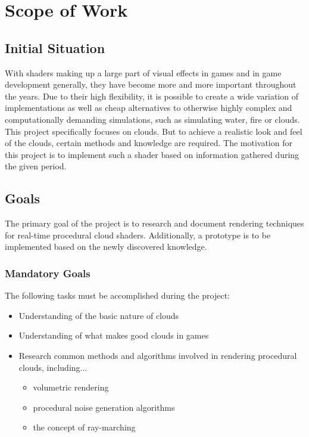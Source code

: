 \section{Scope of Work}

\subsection{Initial Situation}
With shaders making up a large part of visual effects in games and in game development generally, they have become more and more important throughout the years. Due to their high flexibility, it is possible to create a wide variation of implementations as well as cheap alternatives to otherwise highly complex and computationally demanding simulations, such as simulating water, fire or clouds.
\\ This project specifically focuses on clouds. But to achieve a realistic look and feel of the clouds, certain methods and knowledge are required. The motivation for this project is to implement such a shader based on information gathered during the given period.


\subsection{Goals}
The primary goal of the project is to research and document rendering techniques for real-time procedural cloud shaders. Additionally, a prototype is to be implemented based on the newly discovered knowledge.

\subsubsection{Mandatory Goals}
The following tasks must be accomplished during the project:
\begin{itemize}
\item Understanding of the basic nature of clouds
\item Understanding of what makes good clouds in games
\item Research common methods and algorithms involved in rendering procedural clouds, including...
\begin{itemize}
    \item volumetric rendering
    \item procedural noise generation algorithms
    \item the concept of ray-marching
    \end{itemize}
\end{itemize}

